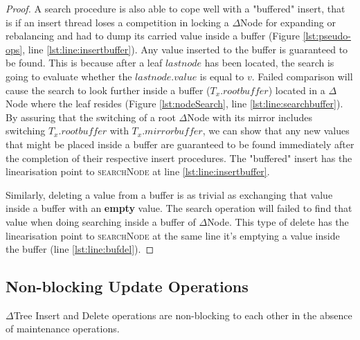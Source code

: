 \begin{proof}
A search procedure is also able to cope well with a "buffered" insert, that is
if an insert thread loses a competition in locking a $\Delta$Node for expanding
or rebalancing and had to dump its carried value inside a buffer (Figure
\ref{lst:pseudo-ops}, line \ref{lst:line:insertbuffer}). Any value inserted to
the buffer is guaranteed to be found. This is because after a leaf $lastnode$
has been located, the search is going to evaluate whether the $lastnode.value$
is equal to $v$. Failed comparison will cause the search to look further inside
a buffer ($T_x.rootbuffer$) located in a $\Delta$Node where the leaf resides
(Figure \ref{lst:nodeSearch}, line \ref{lst:line:searchbuffer}).
By assuring  that the switching of a root $\Delta$Node with its mirror includes
switching $T_x.rootbuffer$ with $T_x.mirrorbuffer$, we can show that any new
values that might be placed inside a buffer are guaranteed to be found
immediately after the completion of their respective insert procedures.
The "buffered" insert has the linearisation point to \textsc{searchNode} at
line \ref{lst:line:insertbuffer}.

Similarly, deleting a value from a buffer is as trivial as exchanging that value
inside a buffer with an \textbf{empty} value. The search operation will failed
to find that value when doing searching inside a buffer of $\Delta$Node. This
type of delete has the linearisation point to \textsc{searchNode} at the same
line it's emptying a value inside the buffer (line \ref{lst:line:bufdel}).
\end{proof}

\subsection{Non-blocking Update Operations} 

\begin{lemma}
$\Delta$Tree Insert and Delete operations are
non-blocking to each other in the absence of maintenance operations.
\end{lemma}

